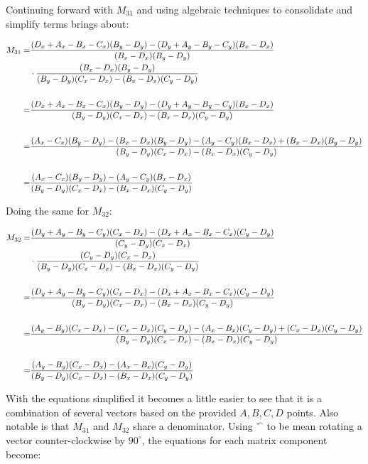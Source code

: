 \documentclass[letterpaper, 11pt]{article}
\begin{document}
\begin{enumerate}
 Continuing forward with \(M_{31}\) and using algebraic techniques to consolidate and simplify terms brings about:

\begin{align}
M_{31} =& \frac{(D_x + A_x - B_x - C_x)(B_y - D_y) - (D_y + A_y - B_y - C_y)(B_x - D_x)}{(B_x - D_x)(B_y - D_y)} \\
&\cdot \frac{(B_x - D_x)(B_y - D_y)}{(B_y - D_y)(C_x - D_x) - (B_x - D_x)(C_y - D_y)} \\ \\
=& \frac{(D_x + A_x - B_x - C_x)(B_y - D_y) - (D_y + A_y - B_y - C_y)(B_x - D_x)}{(B_y - D_y)(C_x - D_x) - (B_x - D_x)(C_y - D_y)} \\ \\
=& { \scriptsize \frac{(A_x - C_x)(B_y - D_y) - (B_x - D_x)(B_y - D_y) - (A_y - C_y)(B_x - D_x) + (B_x - D_x)(B_y - D_y)}{(B_y - D_y)(C_x - D_x) - (B_x - D_x)(C_y - D_y)} } \\ \\
=& \frac{(A_x - C_x)(B_y - D_y) - (A_y - C_y)(B_x - D_x)}{(B_y - D_y)(C_x - D_x) - (B_x - D_x)(C_y - D_y)}
\end{align}

Doing the same for \(M_{32}\):

\begin{align}
M_{32} =& \frac{(D_y + A_y - B_y - C_y)(C_x - D_x) - (D_x + A_x - B_x - C_x)(C_y - D_y)}{(C_y - D_y)(C_x - D_x)} \\
&\cdot \frac{(C_y - D_y)(C_x - D_x)}{(B_y - D_y)(C_x - D_x) - (B_x - D_x)(C_y - D_y)} \\ \\
=& \frac{(D_y + A_y - B_y - C_y)(C_x - D_x) - (D_x + A_x - B_x - C_x)(C_y - D_y)}{(B_y - D_y)(C_x - D_x) - (B_x - D_x)(C_y - D_y)} \\ \\
=& {\scriptsize \frac{(A_y - B_y)(C_x - D_x) - (C_x - D_x)(C_y - D_y) - (A_x - B_x)(C_y - D_y) + (C_x - D_x)(C_y - D_y)}{(B_y - D_y)(C_x - D_x) - (B_x - D_x)(C_y - D_y)} } \\ \\
=& \frac{(A_y - B_y)(C_x - D_x) - (A_x - B_x)(C_y - D_y)}{(B_y - D_y)(C_x - D_x) - (B_x - D_x)(C_y - D_y)}
\end{align}

With the equations simplified it becomes a little easier
to see that it is a combination of several vectors based
on the provided \(A, B, C, D\) points. Also notable is that \(M_{31}\) and \(M_{32}\) share a denominator. Using \(^{\curvearrowleft}\) to be mean rotating a vector counter-clockwise by \(90^{\circ}\), the equations for each matrix component become:


\end{enumerate}
\end{document}
